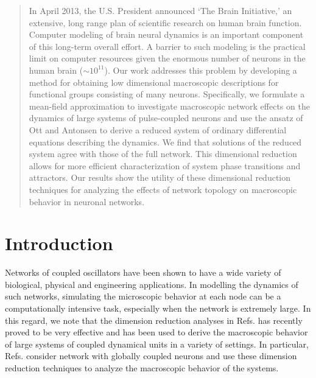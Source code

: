 \documentclass[%
 aip,
 sd,%
 amsmath,amssymb,
 reprint,%
]{revtex4-1}
\begin{document}
\maketitle
\begin{quotation}
In April 2013, the U.S. President announced `The Brain Initiative,' an extensive, long range plan of scientific research on human brain function. Computer modeling of brain neural dynamics is an important component of this long-term overall effort. A barrier to such modeling is the practical limit on computer resources given the enormous number of neurons in the human brain ($\sim 10^{11}$). Our work addresses this problem by developing a method for obtaining low dimensional macroscopic descriptions for functional groups consisting of many neurons. Specifically, we formulate a mean-field approximation to investigate macroscopic network effects on the dynamics of large systems of pulse-coupled neurons and use the ansatz of Ott and Antonsen to derive a reduced system of ordinary differential equations describing the dynamics. We find that solutions of the reduced system agree with those of the full network. This dimensional reduction allows for more efficient characterization of system phase transitions and attractors. Our results show the utility of these dimensional reduction techniques for analyzing the effects of network topology on macroscopic behavior in neuronal networks.
\end{quotation}

\section{Introduction}

Networks of coupled oscillators have been shown to have a wide variety of biological, physical and engineering applications\cite{michaels1987mechanisms, wiesenfeld1998frequency,kiss2002emerging,motter2013spontaneous, carreras2004complex, glass1973logical, aldana2003natural, luke2013complete, abdulrehem2009low, montbrio2015macroscopic, pazo2014low, laing2014derivation, lu2016resynchronization}. In modelling the dynamics of such networks, simulating the microscopic behavior at each node can be a computationally intensive task, especially when the network is extremely large. In this regard, we note that the dimension reduction analyses in Refs.\cite{ott2008low, ott2009long, ott2011comment} has recently proved to be very effective and has been used to derive the macroscopic behavior of large systems of coupled dynamical units in a variety of settings\cite{restrepo2014mean, montbrio2015macroscopic, martens2009exact, barlev2011dynamics, skardal2015frequency, pazo2014low, pazo2016quasiperiodic, roulet2016average}. In particular, Refs. \cite{luke2013complete, montbrio2015macroscopic, pazo2014low, laing2014derivation} consider network with globally coupled neurons and use these dimension reduction techniques to analyze the macroscopic behavior of the systems.
\end{document}
